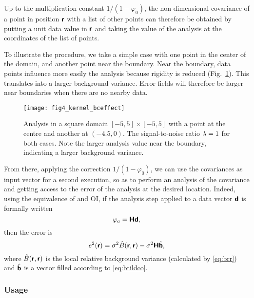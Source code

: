 Up to the multiplication constant $1/(1-\varphi_0)$, the non-dimensional covariance of a point in position $\mbox{\boldmath $ \protect\mathsf{r} $}$ with a list of other points can therefore be obtained by putting a unit data value in $\mbox{\boldmath $ \protect\mathsf{r} $}$ and taking the value of the analysis at the coordinates of the list of points. 

To illustrate the procedure, we take a simple case with one point in the center of the domain, and another point near the boundary.
Near the boundary, data points influence more easily the analysis because rigidity is reduced (Fig.~\ref{fig:fig4_kernel_bceffect}). This translates into a larger background variance. Error fields will therefore be larger near boundaries when there are no nearby data.
 
\begin{figure}[htpb]
\centering
\texttt{[image: fig4\_kernel\_bceffect]}
\caption[Analysis in a square domain with a point at the centre and another at $(-4.5,0)$.]{Analysis in a square domain $[-5,5]\times[-5,5]$ with a point at the centre and another at $(-4.5,0)$. The signal-to-noise ratio $\lambda=1$ for both cases. Note the larger analysis value near the boundary, indicating a larger background variance.
\label{fig:fig4_kernel_bceffect}}
\end{figure} 
 
From there, applying the correction $1/(1-\varphi_0)$, we can use the covariances as input vector for a second \diva execution, so as to perform an analysis of the covariance and getting access to the error of the analysis at the desired location. Indeed, using the equivalence of \diva and OI, if the analysis step applied to a data vector $\mbox{\boldmath $ \protect\mathsf{d} $}$ is formally written 
\begin{equation}
\varphi_a = \mbox{\boldmath $ \protect\mathsf{H} $} \mbox{\boldmath $ \protect\mathsf{d} $},
\end{equation}
then the error is 
\begin{equation}
e^2 (\mbox{\boldmath $ \protect\mathsf{r} $}) = \sigma^2 \hat{B}(\mbox{\boldmath $ \protect\mathsf{r} $},\mbox{\boldmath $ \protect\mathsf{r} $}) - \sigma^2 \mbox{\boldmath $ \protect\mathsf{H} $} \hat{\mbox{\boldmath $ \protect\mathsf{b} $}},
\end{equation}
where $\hat{B}(\mbox{\boldmath $ \protect\mathsf{r} $},\mbox{\boldmath $ \protect\mathsf{r} $})$ is the local relative background variance (calculated by \eqref{eq:brr}) and $\hat{\mbox{\boldmath $ \protect\mathsf{b} $}}$ is a vector filled according to \eqref{eq:btildco}.

\subsubsection{Usage}

